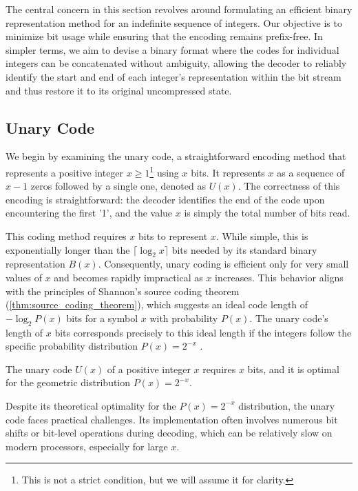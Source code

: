 \noindent The central concern in this section revolves around formulating an efficient binary representation method for an indefinite sequence of integers. Our objective is to minimize bit usage while ensuring that the encoding remains prefix-free. In simpler terms, we aim to devise a binary format where the codes for individual integers can be concatenated without ambiguity, allowing the decoder to reliably identify the start and end of each integer's representation within the bit stream and thus restore it to its original uncompressed state.

\subsection{Unary Code}
We begin by examining the unary code, a straightforward encoding method that represents a positive integer $x \geq 1$\footnote{This is not a strict condition, but we will assume it for clarity.} using $x$ bits. It represents $x$ as a sequence of $x-1$ zeros followed by a single one, denoted as $U(x)$. The correctness of this encoding is straightforward: the decoder identifies the end of the code upon encountering the first '1', and the value $x$ is simply the total number of bits read.

\noindent This coding method requires $x$ bits to represent $x$. While simple, this is exponentially longer than the $\lceil\log_2 x \rceil$ bits needed by its standard binary representation $B(x)$. Consequently, unary coding is efficient only for very small values of $x$ and becomes rapidly impractical as $x$ increases. This behavior aligns with the principles of Shannon's source coding theorem (\autoref{thm:source_coding_theorem}), which suggests an ideal code length of $-\log_2 P(x)$ bits for a symbol $x$ with probability $P(x)$. The unary code's length of $x$ bits corresponds precisely to this ideal length if the integers follow the specific probability distribution $P(x) = 2^{-x}$ \cite{ferragina2023pearls}.

\begin{theorem}
    The unary code $U(x)$ of a positive integer $x$ requires $x$ bits, and it is optimal for the geometric distribution $P(x)=2^{-x}$.
\end{theorem}

\noindent Despite its theoretical optimality for the $P(x)=2^{-x}$ distribution, the unary code faces practical challenges. Its implementation often involves numerous bit shifts or bit-level operations during decoding, which can be relatively slow on modern processors, especially for large $x$.


